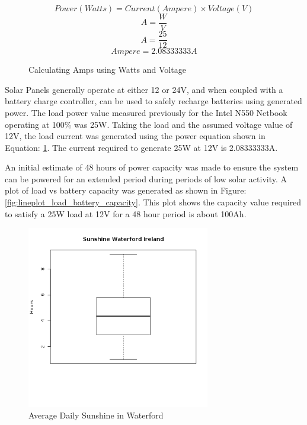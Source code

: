 \documentclass[runningheads,a4paper]{llncs}
\begin{document}
%
\begin{figure}[here]
	\centering
	\begin{equation}
	Power(Watts) = Current(Ampere) \times Voltage(V)
	\end{equation}
	\begin{equation}
	A = \frac{W}{V}
	\end{equation}
	\begin{equation}
	A = \frac{25}{12}
	\end{equation}
	\begin{equation}
	Ampere = 2.08333333 A
	\end{equation}
	\caption{Calculating Amps using Watts and Voltage}
	\label{fig:power_equation}
\end{figure}
%

Solar Panels generally operate at either 12 or 24V, and when coupled with a battery charge controller, can be used to safely recharge batteries using generated power. The load power value measured previously for the Intel N550 Netbook operating at 100\% was 25W. Taking the load and the assumed voltage value of 12V, the load current was generated using the power equation shown in Equation: \ref{fig:power_equation}. The current required to generate 25W at 12V is 2.08333333A.

An initial estimate of 48 hours of power capacity was made to ensure the system can be powered for an extended period during periods of low solar activity. A plot of load vs battery capacity was generated as shown in Figure: \ref{fig:lineplot_load_battery_capacity}. This plot shows the capacity value required to satisfy a 25W load at 12V for a 48 hour period is about 100Ah.

%
\begin{figure}[!htb]
	\centering
	\includegraphics[width=8cm]{images/62}
	\caption{Average Daily Sunshine in Waterford}
	\label{fig:boxplot_hours_sunshine_waterford}
\end{figure}
%
\end{document}
